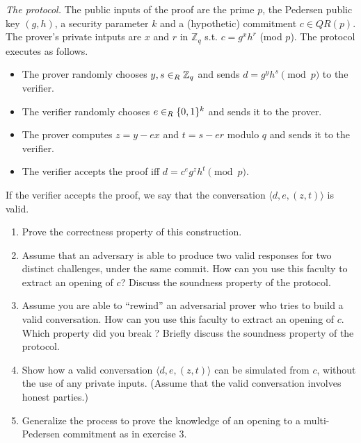 \emph{The protocol.} The public inputs of the proof are the prime $p$,
the Pedersen public key $(g, h)$, a security parameter $k$ and a
(hypothetic) commitment $c\in QR(p)$. The prover's private intputs are
$x$ and $r$ in $\mathbb{Z}_q$ s.t. $c=g^xh^r$ (mod $p$). The protocol executes as follows.
\begin{itemize}
	\item The prover randomly chooses $y,s \in_R \mathbb{Z}_q$ and sends $d=g^yh^s  \pmod{p}$ to the verifier.
	\item The verifier randomly chooses $e\in_R \{0, 1\}^k$ and sends it to the prover.
	\item The prover computes $z=y-ex$ and  $t=s-er$ modulo $q$ and sends it to the verifier.
	\item The verifier accepts the proof iff $d = c^e g^zh^t
	\pmod{p}$.
\end{itemize}
If the verifier accepts the proof, we say that the conversation $\langle d,e,(z,t) \rangle$ is valid.
%
\begin{enumerate}
	\item Prove the correctness property of this construction.

	\item Assume that an adversary is able to produce two valid responses for two distinct challenges, under the same commit.
	How can you use this faculty to extract an opening of $c$?
	Discuss the soundness property of the protocol.

	\item Assume you are able to ``rewind'' an adversarial prover
	who tries to build a valid conversation. How can you use
	this faculty to extract an opening of $c$. Which property
	did you break ? Briefly discuss the soundness property of
	the protocol.

	\item Show how a valid conversation $\langle
	d,e,(z,t) \rangle$ can be simulated from $c$, without the use of any
	private inputs. (Assume that the valid conversation involves
	honest parties.)

	\item Generalize the process to prove the knowledge of an opening to
	a multi-Pedersen commitment as in exercise 3.
\end{enumerate}


